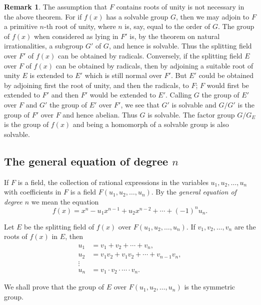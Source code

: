 \documentclass[10pt,leqno]{article}
\theoremstyle{definition}
\newtheorem*{rema}{Remark}
\begin{document}
\begin{rema}
The assumption that $F$ contains roots of unity is not necessary in the above theorem.
For if $f(x)$ has a solvable group $G$, then we may adjoin to $F$ a primitive $n$-th root of unity, where $n$ is, say, equal to the order of $G$.
The group of $f(x)$ when considered as lying in $F'$ is, by the theorem on natural irrationalities, a subgroup $G'$ of $G$, and hence is solvable.
Thus the splitting field over $F'$ of $f(x)$ can be obtained by radicals.
Conversely, if the splitting field $E$ over $F$ of $f(x)$ can be obtained by radicals, then by adjoining a suitable root of unity $E$ is extended to $E'$ which is still normal over $F'$.
But $E'$ could be obtained by adjoining first the root of unity, and then the radicals, to $F$; $F$ would first be extended to $F'$ and then $F'$ would be extended to $E'$.
Calling $G$ the group of $E'$ over $F$ and $G'$ the group of $E'$ over $F'$, we see that $G'$ is solvable and $G / G'$ is the group of $F'$ over $F$ and hence abelian.
Thus $G$ is solvable.
The factor group $G / G_E$ is the group of $f(x)$ and being a homomorph of a solvable group is also solvable.
\end{rema}


\subsection[The general equation of degree n]{The general equation of degree $n$}

If $F$ is a field, the collection of rational expressions in the variables $u_1, u_2, \ldots, u_n$ with coefficients in $F$ is a field $F(u_1, u_2, \ldots, u_n)$.
By the \emph{general equation of degree $n$} we mean the equation
\begin{equation}
\label{eq:III.1}
f(x) = x^n - u_1 x^{n-1} + u_2 x^{n-2} + \cdots + (-1)^n u_n.
\end{equation}

Let $E$ be the splitting field of $f(x)$ over $F(u_1, u_2, \ldots, u_n)$.
If $v_1, v_2, \ldots, v_n$ are the roots of $f(x)$ in $E$, then
\begin{align*}
u_1 &= v_1 + v_2 + \cdots + v_n,
\\
u_2 &= v_1 v_2 + v_1 v_2 + \cdots + v_{n-1} v_n,
\\
\vdots &
\\
u_n &= v_1 \cdot v_2 \cdot \cdots \cdot v_n.
\end{align*}

We shall prove that the group of $E$ over $F(u_1, u_2, \ldots, u_n)$ is the symmetric group.
\end{document}
